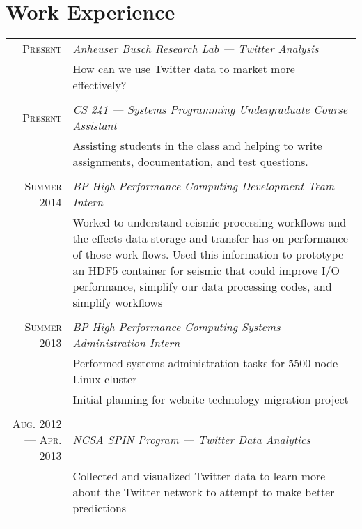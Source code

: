 \documentclass[letterpaper,10pt]{article}
\begin{document}
\section{Work Experience}
\begin{tabular}{rp{11cm}}
    \textsc{Present}
    & \emph{Anheuser Busch Research Lab --- Twitter Analysis}\\
    & How can we use Twitter data to market more effectively?
    \\\multicolumn{1}{c}{}\\

    \textsc{Present}
    & \emph{CS 241 --- Systems Programming Undergraduate Course Assistant}\\
    & Assisting students in the class and helping to write assignments, documentation, and test questions.
    \\\multicolumn{1}{c}{}\\

    \textsc{Summer 2014}
    & \emph{BP High Performance Computing Development Team Intern}\\
    & Worked to understand seismic processing workflows and the effects data storage and transfer has on performance of those work flows. Used this information to prototype an HDF5 container for seismic that could improve I/O performance, simplify our data processing codes, and simplify workflows
    \\\multicolumn{1}{c}{}\\

    \textsc{Summer 2013}
    & \emph{BP High Performance Computing Systems Administration Intern}\\
    & Performed systems administration tasks for \~5500 node Linux cluster\\
    & Initial planning for website technology migration project
    \\\multicolumn{1}{c}{}\\

    \textsc{Aug. 2012 --- Apr. 2013}
    & \emph{NCSA SPIN Program --- Twitter Data Analytics}\\
    & Collected and visualized Twitter data to learn more about the Twitter network to attempt to make better predictions
    \\\multicolumn{1}{c}{}\\
\end{tabular}
\end{document}
